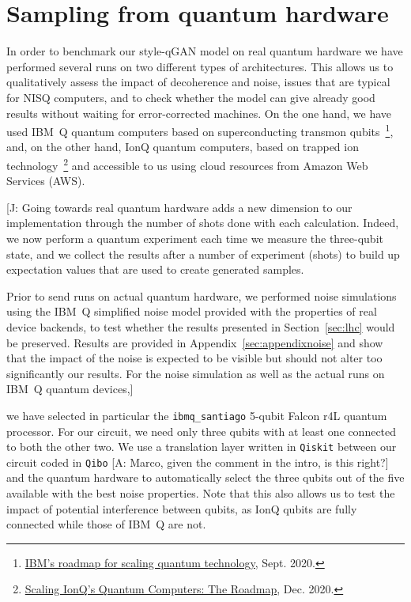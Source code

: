 \documentclass[twocolumn,preprintnumbers,superscriptaddress]{revtex4-2}
\newcommand{\commentJB}[1]{{\color{blue} {[J: #1]}}}
\newcommand{\commentAF}[1]{{\color{cyan} {[A: #1]}}}
\begin{document}
\section{Sampling from quantum hardware}
\label{sec:deployment}

In order to benchmark our style-qGAN model on real quantum hardware we
have performed several runs on two different types of
architectures. This allows us to qualitatively assess the impact of
decoherence and noise, issues that are typical for NISQ computers, and
to check whether the model can give already good results without
waiting for error-corrected machines. On the one hand, we have used IBM~Q
quantum computers based on superconducting transmon
qubits~\footnote{\href{https://research.ibm.com/blog/ibm-quantum-roadmap}{IBM's roadmap for scaling quantum technology}, Sept. 2020.}, and, on the other hand, IonQ quantum computers, based on trapped ion technology~\footnote{\href{https://IonQ.com/posts/december-09-2020-scaling-quantum-computer-roadmap}{Scaling IonQ's Quantum Computers: The Roadmap}, Dec. 2020.} and
accessible to us using cloud resources from Amazon Web Services
(AWS).


\commentJB{
 Going towards real quantum hardware adds a new dimension to our implementation through the number of shots done with each calculation. Indeed, we
 now perform a quantum experiment each time we measure the three-qubit state, and we collect the results after a number of experiment (shots) to build
 up expectation values that are used to create generated samples.

 Prior to send runs on actual quantum hardware, we performed noise simulations using the
IBM~Q simplified noise model provided with the properties of real device backends, to test whether
the results presented in Section~\ref{sec:lhc} would be preserved. Results are provided in Appendix~\ref{sec:appendixnoise}
and show that the impact of the noise is expected to be visible but should not alter too significantly our
results. For the noise simulation as well as the actual runs on IBM~Q quantum devices,}
we have selected in particular the {\tt ibmq\_santiago} 5-qubit Falcon r4L quantum processor.
For our circuit, we need only three qubits with at least one connected to both the other two.
We use a translation layer written in \texttt{Qiskit} between our circuit coded in \texttt{Qibo} \commentAF{Marco, given the comment in the intro, is this right?}
and the quantum hardware to automatically select the three qubits out of the five available
with the best noise properties. Note that this also allows us to test the impact of potential
interference between qubits, as IonQ qubits are fully connected while those of IBM~Q are not.
\end{document}
